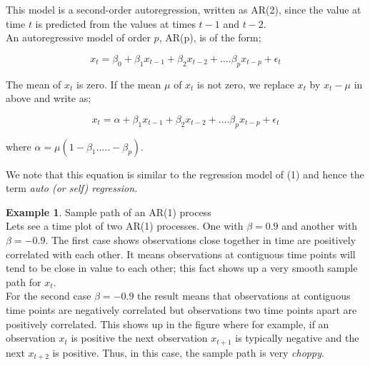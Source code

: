 \documentclass[a4paper]{article}
\theoremstyle{definition}
\newtheorem{exmp}{Example}[section]
\begin{document}
This model is a second-order autoregression, written as AR(2), since the value at time $ t $ is predicted from the values at times $ t-1 $ and $ t-2 $. \\

An autoregressive model of order $ p $, AR(p), is of the form;  

\begin{equation}  
x_{t}=\beta_{0}+\beta_{1}x_{t-1}+\beta_{2}x_{t-2}+ .... \beta_{p}x_{t-p}+ \epsilon_{t}  
\end{equation}

The mean of $ x_t $ is zero. If the mean $ \mu $ of $ x_t $ is not zero, we replace $ x_t $ by $ x_{t} - \mu $ in above and write as; 

\begin{equation}  
x_{t}=\alpha + \beta_{1}x_{t-1}+\beta_{2}x_{t-2}+ .... \beta_{p}x_{t-p}+ \epsilon_{t}  
\end{equation}

where $ \alpha = \mu(1-\beta_1.....- \beta_p) $. 

We note that this equation is similar to the regression model of (1) and hence the term \textit{auto (or self) regression.}\\


\begin{exmp}{Sample path of an AR(1) process}\\
Lets see a time plot of two AR(1) processes. One with $ \beta = 0.9 $ and another with $ \beta = -0.9 $. The first case shows observations close together in time are positively correlated with each other. It means observations at contiguous time points will tend to be close in value to each other; this fact shows up a very smooth sample path for $ x_t $. \\
For the second case $ \beta = -0.9 $ the result means that observations at contiguous time points are negatively correlated but observations two time points apart are positively correlated. This shows up in the figure where for example, if an observation $ x_t $ is positive the next observation $ x_{t+1} $ is typically negative and the next $ x_{t+2} $ is positive. Thus, in this case, the sample path is very \textit{choppy}.
\end{exmp}
\end{document}
